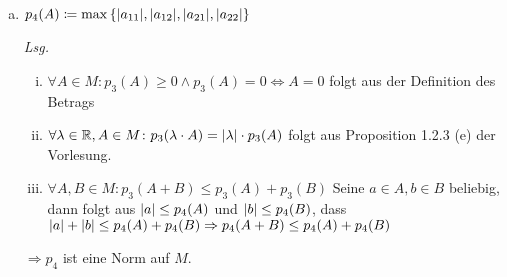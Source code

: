 \documentclass{scrreprt}
\begin{document}
\begin{enumerate}[a)]
\item $p_4(A) \coloneqq \max\qty{\abs{a_{11}}, \abs{a_{12}}, \abs{a_{21}}, \abs{a_{22}}}$

  \textit{Lsg.}
  \begin{enumerate}[(i)]
  \item $\forall A \in M \colon p_3(A) \geq 0 \land p_3(A) = 0 \iff A = 0$ folgt aus der Definition des Betrags
  \item $\forall \lambda \in \mathbb{R}, A \in M \colon p_3(\lambda \cdot A) = \abs{\lambda} \cdot p_3(A)$
    folgt aus Proposition  1.2.3 (e) der Vorlesung.
  \item $\forall A, B \in M \colon p_3(A + B) \leq p_3(A) + p_3(B)$
    Seine $a \in A, b \in B$ beliebig, dann folgt aus
    $\abs{a} \leq p_4(A)$ und $\abs{b} \leq p_4(B)$, dass
    $\abs{a} + \abs{b} \leq p_4(A) + p_4(B) \Rightarrow p_4(A + B) \leq p_4(A) + p_4(B)$
  \end{enumerate}
  $\Rightarrow p_4$ ist eine Norm auf $M$.
\end{enumerate}
\end{document}
